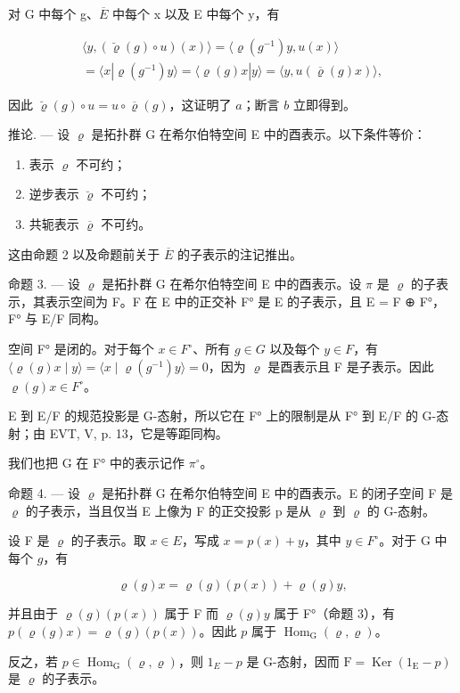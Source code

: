 对 G 中每个 g、\(\overline{E}\) 中每个 x 以及 E 中每个 y，有

\[
\begin{array}{c} \langle y, (\breve {\varrho} (g) \circ u) (x) \rangle = \langle \varrho (g ^ {- 1}) y, u (x) \rangle \\ = \langle x | \varrho (g ^ {- 1}) y \rangle = \langle \varrho (g) x | y \rangle = \langle y, u (\overline {{\varrho}} (g) x) \rangle , \end{array}
\]

因此 \(\breve{\varrho}(g) \circ u = u \circ \overline{\varrho}(g)\)，这证明了 \(a\)；断言 \(b\) 立即得到。

推论. --- 设 \(\varrho\) 是拓扑群 G 在希尔伯特空间 E 中的酉表示。以下条件等价：

\begin{enumerate}
\def\labelenumi{(\roman{enumi})}
\item
  表示 \(\varrho\) 不可约；
\item
  逆步表示 \(\breve{\varrho}\) 不可约；
\item
  共轭表示 \(\overline{\varrho}\) 不可约。
\end{enumerate}

这由命题 2 以及命题前关于 \(\overline{E}\) 的子表示的注记推出。

命题 3. --- 设 \(\varrho\) 是拓扑群 G 在希尔伯特空间 E 中的酉表示。设 \(\pi\) 是 \(\varrho\) 的子表示，其表示空间为 F。F 在 E 中的正交补 F° 是 E 的子表示，且 E = F ⊕ F°，F° 与 E/F 同构。

空间 F° 是闭的。对于每个 \(x \in F^{\circ}\)、所有 \(g \in G\) 以及每个 \(y \in F\)，有 \(\langle \varrho(g)x \mid y \rangle = \langle x \mid \varrho(g^{-1})y \rangle = 0\)，因为 \(\varrho\) 是酉表示且 F 是子表示。因此 \(\varrho(g)x \in F^{\circ}\)。

E 到 E/F 的规范投影是 G-态射，所以它在 F° 上的限制是从 F° 到 E/F 的 G-态射；由 EVT, V, p. 13，它是等距同构。

我们也把 G 在 F° 中的表示记作 \(\pi^{\circ}\)。

命题 4. --- 设 \(\varrho\) 是拓扑群 G 在希尔伯特空间 E 中的酉表示。E 的闭子空间 F 是 \(\varrho\) 的子表示，当且仅当 E 上像为 F 的正交投影 p 是从 \(\varrho\) 到 \(\varrho\) 的 G-态射。

设 F 是 \(\varrho\) 的子表示。取 \(x \in E\)，写成 \(x = p(x) + y\)，其中 \(y \in F^{\circ}\)。对于 G 中每个 \(g\)，有

\[
\varrho (g) x = \varrho (g) (p (x)) + \varrho (g) y,
\]

并且由于 \(\varrho(g)(p(x))\) 属于 F 而 \(\varrho(g)y\) 属于 F°（命题 3），有 \(p(\varrho(g)x) = \varrho(g)(p(x))\)。因此 \(p\) 属于 \(\operatorname{Hom}_{\mathrm{G}}(\varrho, \varrho)\)。

反之，若 \(p \in \operatorname{Hom}_{\mathrm{G}}(\varrho, \varrho)\)，则 \(1_{E} - p\) 是 G-态射，因而 \(\mathrm{F} = \operatorname{Ker}(1_{\mathrm{E}} - p)\) 是 \(\varrho\) 的子表示。

